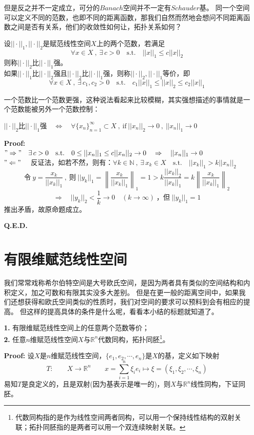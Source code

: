 但是反之并不一定成立，可分的$Banach$空间并不一定有$Schauder$基。
\vspace{0.5cm}
同一个空间可以定义不同的范数，也即不同的距离函数，那我们自然而然地会想问不同距离函数之间是否有关系，他们的收敛性如何让，拓扑关系如何？
\begin{definition}[等价范数]
    设$||\cdot||_1,||\cdot||_2$是赋范线性空间$X$上的两个范数，若满足
    \[\forall x \in X \ , \ \exists \, c>0 \quad \text{s.t.} \quad ||x||_1 \leq c||x||_2\]
    则称$||\cdot||_2$比$||\cdot||_1$强。\\
    如果$||\cdot||_1$比$||\cdot||_2$强且$||\cdot||_2$比$||\cdot||_1$强，则称$||\cdot||_2,||\cdot||_1$等价，即
    \[\forall x \in X \ , \ \exists \, c_1,c_2>0 \quad \text{s.t.} \quad c_1||x||_1 \leq ||x||_2 \leq c_2||x||_1\]
\end{definition}
一个范数比一个范数更强，这种说法看起来比较模糊，其实强想描述的事情就是一个范数能被另外一个范数控制：
\begin{theorem}
    $||\cdot||_2$比$||\cdot||_1$强$ \quad \Leftrightarrow \quad \forall \{x_n\}_{n=1}^{\infty} \subset X \ , \ \text{if} \ ||x_n||_2 \to 0 \ , \ ||x_n||_1 \to 0$
\end{theorem}
\textbf{Proof:}\\
$"\Rightarrow" \quad \exists \, c>0 \quad \text{s.t.} \quad 0 \leq ||x_n||_1 \leq c||x_n||_2 \to 0 \quad \Rightarrow \quad ||x_n||_1 \to 0$\\
$"\Leftarrow" \quad$ 反证法，如若不然，则有：$\forall k \in \mathbb{N} \ , \ \exists \, x_k \in X \quad \text{s.t.} \quad ||x_k||_1>k||x_n||_2$\\
\[\text{令} \ y=\frac{x_k}{||x_k||_1} \ , \ \text{则} \ ||y_k||_1=\left\|\frac{x_k}{||x_k||_1}\right\|_1=1>k\frac{||x_k||_2}{||x_k||_1}=k\left\|\frac{x_k}{||x_k||_1}\right\|_2\]
\[\Rightarrow \quad ||y_k||_2<\frac{1}{k} \to 0 \quad (k \to \infty) \ \text{，但} \ ||y_k||_1=1\]
推出矛盾，故原命题成立。

\textbf{Q.E.D.}

\section{有限维赋范线性空间}
我们常常戏称希尔伯特空间是大号欧氏空间，是因为两者具有类似的空间结构和内积定义，加之可数和有限其实没多大差别。
但是在更一般的距离空间中，如果我们还想获得和欧氏空间类似的性质时，我们对空间的要求可以预料到会有相应的提高。
但这样的提高具体的条件是什么呢，看看本小结的标题就知道了。
\begin{theorem}\label{the:B}
    \textbf{1.} \quad 有限维赋范线性空间上的任意两个范数等价；\\
    \textbf{2.} \quad 任意$n$维赋范线性空间$X$与$\mathbb{R}^n$代数同构，拓扑同胚\footnote{代数同构指的是作为线性空间两者同构，可以用一个保持线性结构的双射关联；拓扑同胚指的是两者可以用一个双连续映射关联。}。
\end{theorem}
\textbf{Proof:} \quad 设$X$是$n$维赋范线性空间，$\{e_1,e_2,\cdots,e_n\}$是$X$的基，定义如下映射
\[T: \qquad X \to \mathbb{R}^n \qquad x=\sum_{i=1}^n\xi_ie_i \mapsto \xi=(\xi_1,\xi_2,\cdots,\xi_n)\]
易知$T$是良定义的，且是双射(因为基表示是唯一的)，则$X$与$\mathbb{R}^n$线性同构，下证同胚。


